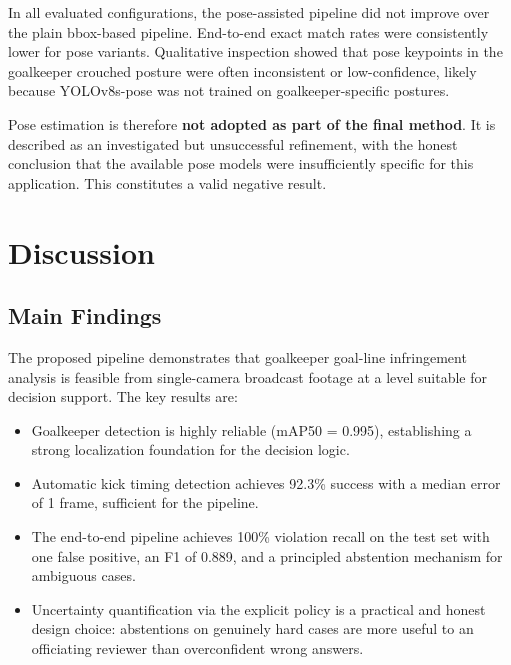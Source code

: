 \documentclass[12pt,a4paper,twoside]{article}
\begin{document}
In all evaluated configurations, the pose-assisted pipeline did not improve over
the plain bbox-based pipeline. End-to-end exact match rates were consistently
lower for pose variants. Qualitative inspection showed that pose keypoints in
the goalkeeper crouched posture were often inconsistent or low-confidence, likely
because YOLOv8s-pose was not trained on goalkeeper-specific postures.

Pose estimation is therefore \textbf{not adopted as part of the final method}.
It is described as an investigated but unsuccessful refinement, with the
honest conclusion that the available pose models were insufficiently specific
for this application. This constitutes a valid negative result.


\section{Discussion}
\label{sec:discussion}

\subsection{Main Findings}

The proposed pipeline demonstrates that goalkeeper goal-line infringement
analysis is feasible from single-camera broadcast footage at a level suitable
for decision support. The key results are:
\begin{itemize}
  \item Goalkeeper detection is highly reliable (mAP50 = 0.995), establishing
        a strong localization foundation for the decision logic.
  \item Automatic kick timing detection achieves 92.3\% success with a median
        error of 1 frame, sufficient for the pipeline.
  \item The end-to-end pipeline achieves 100\% violation recall on the test
        set with one false positive, an F1 of 0.889, and a principled
        abstention mechanism for ambiguous cases.
  \item Uncertainty quantification via the explicit policy is a practical
        and honest design choice: abstentions on genuinely hard cases are
        more useful to an officiating reviewer than overconfident wrong answers.
\end{itemize}
\end{document}
